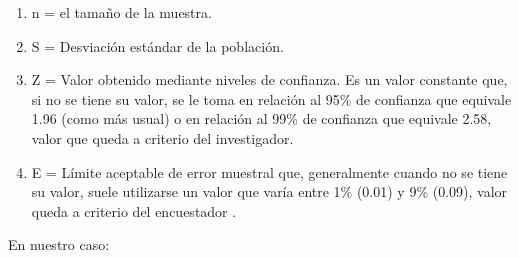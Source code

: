                 \begin{enumerate}
                    \item[]{n = el tamaño de la muestra.}
                    \item[]{S = Desviación estándar de la población.}
                    \item[]{Z = Valor obtenido mediante niveles de confianza. Es un valor constante que, si no se tiene su valor, se le toma en relación al 95{\%} de confianza que equivale 1.96 (como más usual) o en relación al 99{\%} de confianza que equivale 2.58, valor que queda a criterio del investigador.}
                    \item[]{E = Límite aceptable de error muestral que, generalmente cuando no se tiene su valor, suele utilizarse un valor que varía entre 1{\%} (0.01) y 9{\%} (0.09), valor queda a criterio del encuestador  {\cite{sampieri1997}}.}
                \end{enumerate}\par
                En nuestro caso:\par
                \vskip 0.3cm  
